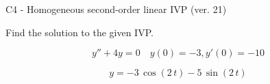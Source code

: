 \begin{exercise}
  \begin{exerciseTitle}C4 - Homogeneous second-order linear IVP (ver. 21)\end{exerciseTitle}
  \begin{exerciseStatement}
    
Find the solution to the given IVP.

    
\[y''+4y = 0 \hspace{1em} y(0) = -3 , y'(0) = -10\]

  \end{exerciseStatement}
  \begin{exerciseAnswer}
    
\[y= -3 \, \cos\left(2 \, t\right) - 5 \, \sin\left(2 \, t\right)\]

  \end{exerciseAnswer}
\end{exercise}